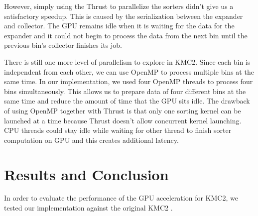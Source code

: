\documentclass{bioinfo}
\begin{document}
\begin{methods}
However, simply using the Thrust to parallelize the sorters didn't give us a satisfactory
speedup.
This is caused by the serialization between the expander and collector.
The GPU remains idle when it is waiting for the data for the expander and it could not
begin to process the data from the next bin until the previous bin's collector finishes
its job.

There is still one more level of parallelism to explore in KMC2.
Since each bin is independent from each other, we can use OpenMP to process multiple bins
at the same time.
In our implementation, we used four OpenMP threads to process four bins simultaneously.
This allows us to prepare data of four different bins at the same time and reduce the 
amount of time that the GPU sits idle.
The drawback of using OpenMP together with Thrust is that only one sorting kernel can be
launched at a time because Thrust doesn't allow concurrent kernel launching. CPU threads
could stay idle while waiting for other thread to finish sorter computation on GPU and
this creates additional latency.
\newline

\end{methods}

\section{Results and Conclusion}
In order to evaluate the performance of the GPU acceleration for KMC2, we tested our
implementation against the original KMC2 \citep{Seb14}.
\end{document}
